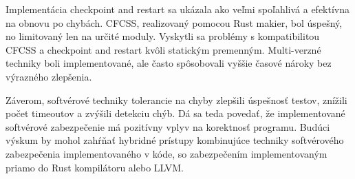 \documentclass[12pt, letterpaper, slovak]{article}
\begin{document}
Implementácia checkpoint and restart sa ukázala ako veľmi spoľahlivá a efektívna na obnovu po chybách. CFCSS, realizovaný pomocou Rust makier, bol úspešný, no limitovaný len na určité moduly. Vyskytli sa problémy s kompatibilitou CFCSS a checkpoint and restart kvôli statickým premenným. Multi-verzné techniky boli implementované, ale často spôsobovali vyššie časové nároky bez výrazného zlepšenia.

Záverom, softvérové techniky tolerancie na chyby zlepšili úspešnosť testov, znížili počet timeoutov a zvýšili detekciu chýb. Dá sa teda povedať, že implementované softvérové zabezpečenie má pozitívny vplyv na korektnosť programu. Budúci výskum by mohol zahŕňať hybridné prístupy kombinujúce techniky softvérového zabezpečenia implementovaného v kóde, so zabezpečením implementovaným priamo do Rust kompilátoru alebo LLVM.



\newpage
\printbibliography

\clearpage
\end{document}
